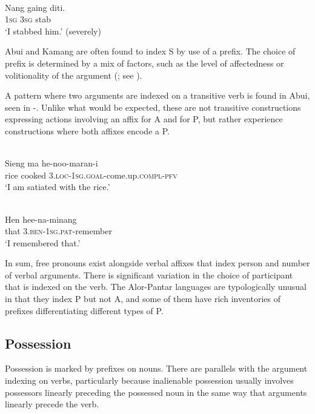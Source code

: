 {  

\ea%
\label{ex:1:19}
 \\
\gll Nang  gaing   diti. \\
 1\textsc{sg}   3\textsc{sg}  stab  \\
\glt `I stabbed him.' (severely)
\z
 


Abui and Kamang are often found to index S by use of a prefix. The choice of prefix is determined by a mix of factors, such as the level of affectedness or volitionality of the argument (\citealt{FeddenEtAl2013,FeddenEtAl2014}; see \citealt{FeddenBrownTV}). 

A pattern where two arguments are indexed on a transitive verb is found in Abui, seen in -. Unlike what would be expected, these are not transitive constructions expressing actions involving an affix for A and for P, but rather experience constructions where both affixes encode a P. 



\ea%
\label{ex:1:20}
 \\
\gll Sieng   ma     he-noo-maran-i \\
rice   cooked   3.\textsc{loc}{}-1\textsc{sg}.\textsc{goal}{}-come.up.\textsc{compl-pfv}   \\
\glt `I am satiated with the rice.'
\z
 







\ea%
\label{ex:1:21}
 \\
\gll Hen   hee-na-minang  \\
 that   3.\textsc{ben}{}-1\textsc{sg}.\textsc{pat}{}-remember  \\
\glt `I remembered that.'
\z
 
In sum, free pronouns exist alongside verbal affixes that index person and number of verbal arguments. There is significant variation in the choice of participant that is indexed on the verb. The Alor-Pantar languages are typologically unusual in that they index P but not A, and some of them have rich inventories of prefixes differentiating different types of P. 

\subsection{Possession}\label{sec:1:5.3}
Possession is marked by prefixes on nouns. There are parallels with the argument indexing on verbs, particularly because inalienable possession usually involves possessors linearly preceding the possessed noun in the same way that arguments linearly precede the verb. 

}
